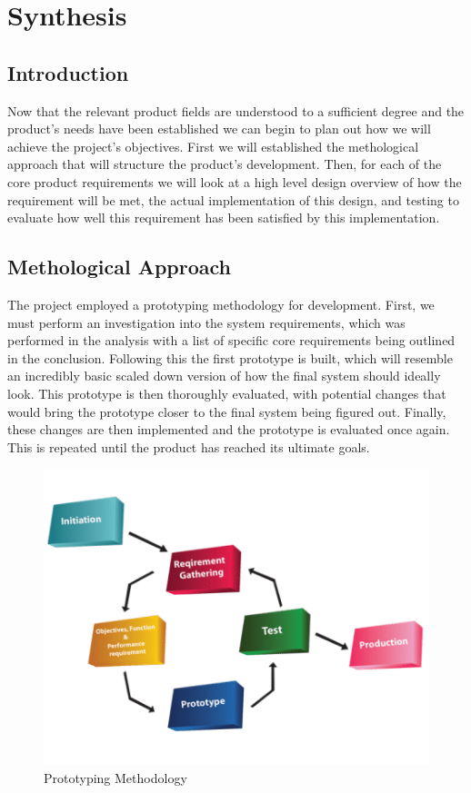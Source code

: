 \part{Synthesis}
	\chapter{Introduction}
	Now that the relevant product fields are understood to a sufficient degree and the product's needs have been established we can begin to plan out how we will achieve the project's objectives. First we will established the methological approach that will structure the product's development. Then, for each of the core product requirements we will look at a high level design overview of how the requirement will be met, the actual implementation of this design, and testing to evaluate how well this requirement has been satisfied by this implementation.
	
	\chapter{Methological Approach}
	\label{synthesis:methodology}
	The project employed a prototyping methodology for development. First, we must perform an investigation into the system requirements, which was performed in the analysis with a list of specific core requirements being outlined in the conclusion. Following this the first prototype is built, which will resemble an incredibly basic scaled down version of how the final system should ideally look. This prototype is then thoroughly evaluated, with potential changes that would bring the prototype closer to the final system being figured out. Finally, these changes are then implemented and the prototype is evaluated once again. This is repeated until the product has reached its ultimate goals.
	\begin{figure}[h]
		\centering
		\includegraphics[width=.8\linewidth]{SYNTHESIS/prototypingdiagram.png}
		\caption{Prototyping Methodology}
		\label{fig:prototypingdiagram}
	\end{figure}
	
